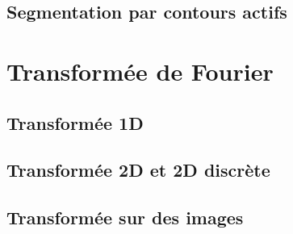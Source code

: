 \documentclass[french]{article}
\begin{document}
\subsection{Segmentation par contours actifs}

\section{Transformée de Fourier}
\subsection{Transformée 1D}
\subsection{Transformée 2D et 2D discrète}
\subsection{Transformée sur des images}
\end{document}
